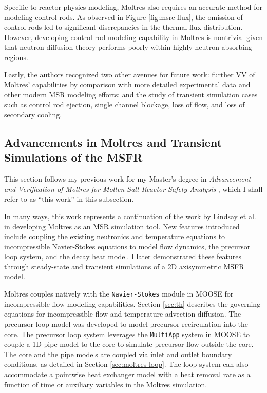 Specific to reactor physics modeling, Moltres also requires an accurate method for modeling
control rods. As observed in Figure \ref{fig:msre-flux}, the omission of control rods led to
significant discrepancies in the thermal flux distribution. However, developing control rod
modeling capability in Moltres is nontrivial given that neutron diffusion theory performs poorly
within highly neutron-absorbing regions.

Lastly, the authors recognized two other avenues for future work: further \gls{VV} of Moltres'
capabilities by comparison
with more detailed experimental data and other modern \gls{MSR} modeling
efforts; and the study of transient simulation cases such as control rod
ejection, single channel blockage, loss of flow, and loss of secondary cooling.

\subsection{Advancements in Moltres and Transient Simulations of the MSFR}
\label{sec:msfr}

This section follows my previous work for my Master's degree in \textit{Advancement and
Verification of Moltres for Molten Salt Reactor Safety Analysis} \cite{park_advancement_2020},
which I shall refer to as ``this work'' in this subsection.

In many ways, this work represents a continuation of the work by Lindsay et al.
\cite{lindsay_introduction_2018} in developing Moltres as an \gls{MSR}
simulation tool. New features introduced include coupling the existing
neutronics and temperature equations to incompressible Navier-Stokes equations
to model flow dynamics, the precursor loop system, and the decay heat model.
I later demonstrated these features through steady-state and transient
simulations of a 2D axisymmetric \gls{MSFR} model.

Moltres couples natively with the \texttt{Navier-Stokes} module in \gls{MOOSE} for
incompressible flow modeling capabilities. Section \ref{sec:th} describes the governing equations
for incompressible flow and temperature advection-diffusion.
The precursor loop model was developed to model
precursor recirculation into the core. The precursor loop system leverages
the \texttt{MultiApp} system in \gls{MOOSE} to couple a 1D pipe model to the
core to simulate precursor flow outside the core. The core and the pipe models
are coupled via inlet and outlet boundary conditions, as detailed in Section
\ref{sec:moltres-loop}. The loop system can also accommodate a pointwise heat
exchanger model with a heat removal rate as a function of time
or auxiliary variables in the Moltres simulation.

